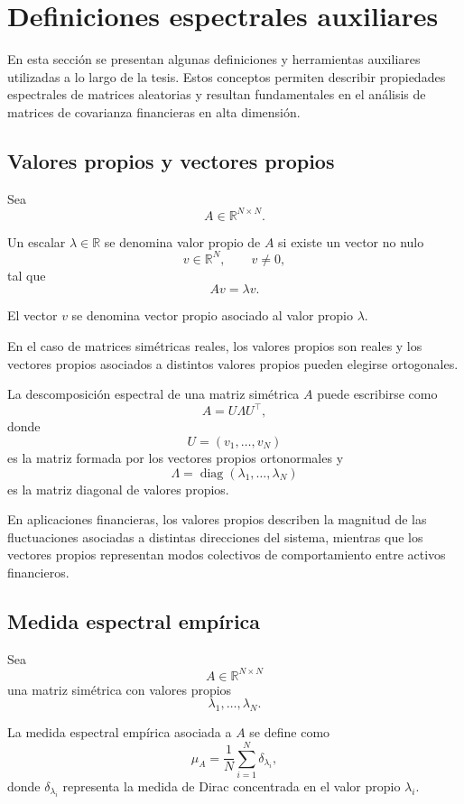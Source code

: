 \documentclass[letterpaper,12pt,oneside]{book}
\begin{document}
\appendix

\chapter{Definiciones espectrales auxiliares}

En esta sección se presentan algunas definiciones y herramientas auxiliares utilizadas a lo largo de la tesis. Estos conceptos permiten describir propiedades espectrales de matrices aleatorias y resultan fundamentales en el análisis de matrices de covarianza financieras en alta dimensión.

\section{Valores propios y vectores propios}

Sea
\[
A\in\mathbb{R}^{N\times N}.
\]

Un escalar \(\lambda\in\mathbb{R}\) se denomina valor propio de \(A\) si existe un vector no nulo
\[
v\in\mathbb{R}^N,
\qquad
v\neq0,
\]
tal que
\[
Av=\lambda v.
\]

El vector \(v\) se denomina vector propio asociado al valor propio \(\lambda\).

En el caso de matrices simétricas reales, los valores propios son reales y los vectores propios asociados a distintos valores propios pueden elegirse ortogonales.

La descomposición espectral de una matriz simétrica \(A\) puede escribirse como
\[
A=
U\Lambda U^\top,
\]
donde
\[
U=
(v_1,\dots,v_N)
\]
es la matriz formada por los vectores propios ortonormales y
\[
\Lambda=
\operatorname{diag}
(\lambda_1,\dots,\lambda_N)
\]
es la matriz diagonal de valores propios.

En aplicaciones financieras, los valores propios describen la magnitud de las fluctuaciones asociadas a distintas direcciones del sistema, mientras que los vectores propios representan modos colectivos de comportamiento entre activos financieros.

\section{Medida espectral empírica}

Sea
\[
A\in\mathbb{R}^{N\times N}
\]
una matriz simétrica con valores propios
\[
\lambda_1,\dots,\lambda_N.
\]

La medida espectral empírica asociada a \(A\) se define como
\[
\mu_A
=
\frac1N
\sum_{i=1}^N
\delta_{\lambda_i},
\]
donde \(\delta_{\lambda_i}\) representa la medida de Dirac concentrada en el valor propio \(\lambda_i\).
\end{document}
